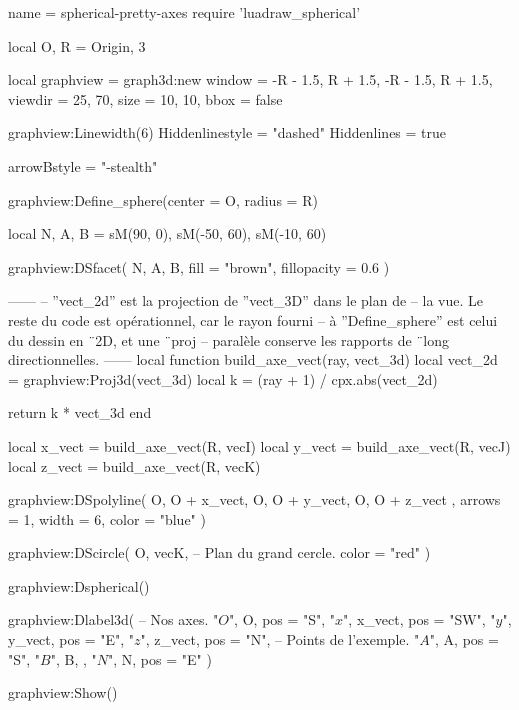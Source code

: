 \documentclass[border = 3pt]{standalone}
\begin{document}
\begin{luadraw*}{name = spherical-pretty-axes}
require 'luadraw_spherical'

local O, R = Origin, 3

local graphview = graph3d:new{
  window  = {-R - 1.5, R + 1.5, -R - 1.5, R + 1.5},
  viewdir = {25, 70},
  size    = {10, 10},
  bbox    = false
}

graphview:Linewidth(6)
Hiddenlinestyle = "dashed"
Hiddenlines     = true

arrowBstyle = "-stealth"

graphview:Define_sphere({center = O, radius = R})

local N, A, B = sM(90, 0), sM(-50, 60), sM(-10, 60)

graphview:DSfacet(
  {N, A, B},
  {fill = "brown", fillopacity = 0.6}
)

------
-- ''vect_2d'' est la projection de ''vect_3D'' dans le plan de
-- la vue. Le reste du code est opérationnel, car le rayon fourni
-- à ''Define_sphere'' est celui du dessin en ¨2D, et une ¨proj
-- paralèle conserve les rapports de ¨long directionnelles.
------
local function build_axe_vect(ray, vect_3d)
  local vect_2d = graphview:Proj3d(vect_3d)
  local k       = (ray + 1) / cpx.abs(vect_2d)

  return k * vect_3d
end

local x_vect = build_axe_vect(R, vecI)
local y_vect = build_axe_vect(R, vecJ)
local z_vect = build_axe_vect(R, vecK)

graphview:DSpolyline(
  {
    {O, O + x_vect},
    {O, O + y_vect},
    {O, O + z_vect}
  },
  {arrows = 1, width = 6, color = "blue"}
)

graphview:DScircle(
  {O, vecK},       -- Plan du grand cercle.
  {color = "red"}
)

graphview:Dspherical()

graphview:Dlabel3d(
-- Nos axes.
  "$O$", O, {pos = "S"},
  "$x$", x_vect, {pos = "SW"},
  "$y$", y_vect, {pos = "E"},
  "$z$", z_vect, {pos = "N"},
-- Points de l'exemple.
  "$A$", A, {pos = "S"},
  "$B$", B, {},
  "$N$", N, {pos = "E"}
)

graphview:Show()
\end{luadraw*}
\end{document}
